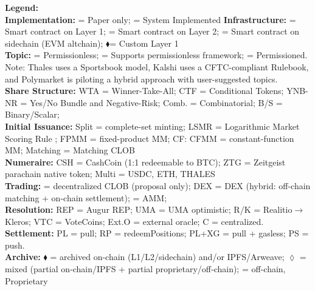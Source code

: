 \begin{table}[H]
{\begin{tabular}{|l|c|c|c|c|c|c|c|c|c|c|c|}
\end{tabular}
}

\vspace{0.30em}
\begin{minipage}{\textwidth}
\footnotesize
\textbf{Legend:} \\
\textbf{Implementation:} \Circle = Paper only; \CIRCLE = System Implemented
\textbf{Infrastructure:} \Circle = Smart contract on Layer 1; \LEFTcircle = Smart  contract on Layer 2; \CIRCLE = Smart contract on sidechain (EVM altchain); $\blacklozenge$= Custom Layer 1\\
\textbf{Topic:} \CIRCLE = Permissionless; \LEFTcircle = Supports permissionless framework; \Circle = Permissioned. Note: Thales uses a Sportsbook model, Kalshi uses a CFTC-compliant Rulebook, and Polymarket is piloting a hybrid approach with user-suggested topics.\\
\textbf{Share Structure:} WTA = Winner-Take-All; CTF = Conditional Tokens; YNB-NR = Yes/No Bundle and Negative-Risk; Comb. = Combinatorial; B/S = Binary/Scalar; \\
\textbf{Initial Issuance:} Split = complete-set minting; LSMR = Logarithmic Market Scoring Rule ; FPMM = fixed-product MM; CF: CFMM = constant-function MM; Matching = Matching CLOB \\
\textbf{Numeraire:} CSH = CashCoin (1:1 redeemable to BTC); ZTG = Zeitgeist parachain native token; Multi = USDC, ETH, THALES \\
\textbf{Trading:} \CIRCLE = decentralized CLOB (proposal only); DEX =  DEX (hybrid: off-chain matching + on-chain settlement); \Circle = AMM;  \\
\textbf{Resolution:} REP = Augur REP; UMA = UMA optimistic; R/K = Realitio$\rightarrow$Kleros; VTC = VoteCoins; Ext.O = external oracle; C = centralized. \\
\textbf{Settlement:} PL = pull; RP = redeemPositions; PL+XG = pull + gasless; PS = push. \\
\textbf{Archive:} $\blacklozenge$ = archived on-chain (L1/L2/sidechain) and/or IPFS/Arweave; $\lozenge$ = mixed (partial on‑chain/IPFS + partial proprietary/off‑chain); \Circle = off-chain, Proprietary\\
\end{minipage}
\end{table} 